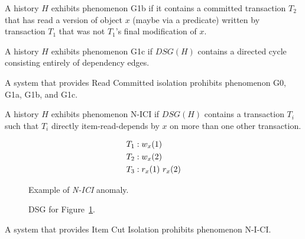 \begin{definition}
A history $H$ exhibits phenomenon G1b if it contains a committed
transaction $T_2$ that has read a version of object $x$ (maybe via a
predicate) written by transaction $T_1$ that was not $T_1$’s ﬁnal
modiﬁcation of $x$.
\end{definition}

\begin{definition}
A history $H$ exhibits phenomenon G1c if $DSG(H)$ contains a directed
cycle consisting entirely of dependency edges.
\end{definition}

\begin{definition}
A system that provides Read Committed isolation prohibits phenomenon G0, G1a, G1b, and G1c.
\end{definition}

\begin{definition}
\label{def:n-ici}
A history $H$ exhibits phenomenon N-ICI if $DSG(H)$ contains a
transaction $T_i$ such that $T_i$ directly item-read-depends by $x$ on more
than one other transaction.
\end{definition}

\begin{figure}[H]
\begin{align*}
\small
T_1 &: w_x(1)\\
T_2 &: w_x(2)\\
T_3 &: r_x(1)~r_x(2)
\end{align*}
\caption{Example of \textit{N-ICI} anomaly.}
\label{fig:nici-history}
\end{figure}

\begin{figure}[H]
\centering
{}
\caption{DSG for Figure~\ref{fig:nici-history}.}
\label{fig:nici-dsg}
\end{figure}

\begin{definition}
A system that provides Item Cut Isolation prohibits phenomenon N-I-CI.
\end{definition}


